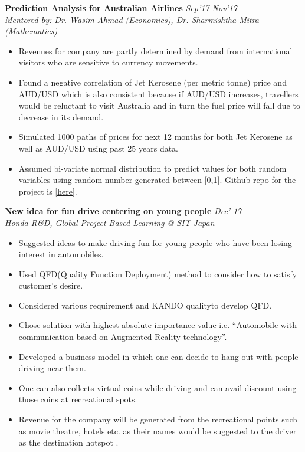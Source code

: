 \documentclass[margin]{res}
\begin{document}
\begin{resume}
\begin{itemize}
\end{itemize}
\textbf{Prediction Analysis for Australian Airlines} \hfill \textit{Sep’17-Nov’17}\\
\textit{Mentored by: Dr. Wasim Ahmad (Economics), Dr. Sharmishtha Mitra (Mathematics)}
\begin{itemize}
\item Revenues for company are partly determined by demand from international visitors who are sensitive to 
currency movements.
\item Found a negative correlation of Jet Kerosene (per metric tonne) price and AUD/USD which is also consistent because if AUD/USD increases, travellers would be reluctant to visit Australia and in turn the fuel price will fall due to decrease in its demand.
\item Simulated 1000 paths of prices for next 12 months for both Jet Kerosene as well as AUD/USD using past 25 years data.
\item Assumed bi-variate normal distribution to predict values for both random variables using random number generated between [0,1]. Github repo for the project is \href{https://github.com/bhavykhatri/prediction-analysis-for-australian-airlines}{[here]}.
\end{itemize}
\textbf{New idea for fun drive centering on young people} \hfill \textit{Dec’ 17}\\
\textit{Honda R\&D, Global Project Based Learning @ SIT Japan}
\begin{itemize}
\item Suggested ideas to make driving fun for young people who have been losing interest in automobiles.
\item Used QFD(Quality Function Deployment) method to consider how to satisfy customer’s desire.
\item Considered various requirement and KANDO qualityto develop QFD.
\item Chose solution with highest absolute importance value i.e. “Automobile with communication based on Augmented Reality technology”.
\item Developed a business model in which one can decide to hang out with people driving near them.
\item One can also collects virtual coins while driving and can avail discount using those coins at recreational spots.
\item Revenue for the company will be generated from the recreational points such as movie theatre, hotels etc. as their names would be suggested to the driver as the destination hotspot .
\end{itemize}


\end{resume}
\end{document}
